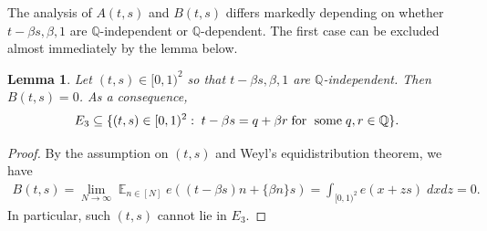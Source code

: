 \documentclass[11pt]{amsart}
\newtheorem{lemma}{Lemma}[section]
\theoremstyle{definition}
\DeclareMathOperator*{\E}{\mathbb{E}}
\newcommand{\Q}{{\mathbb Q}}
\newcommand{\1}{{\mathbf{1}}}
\begin{document}
The analysis of $A(t,s)$ and $B(t,s)$ differs markedly depending on whether $t-\beta s, \beta, 1$ are $\Q$-independent or $\Q$-dependent. The first case can be excluded almost immediately by the lemma below. 
\begin{lemma}\label{L: Q-independence}
    Let $(t,s)\in[0,1)^2$ so that $t-\beta s, \beta, 1$  are $\Q$-independent.
     Then $B(t,s) = 0$.  As a consequence, $$E_3\subseteq \{(t,s)\in[0,1)^2:\; t - \beta s = q + \beta r\; \textrm{for\; some}\; q,r\in\Q\}.$$   

\end{lemma}

\begin{proof}
By the assumption on $(t,s)$ and Weyl's equidistribution theorem, we have
\begin{align*}
    B(t,s) = \lim_{N\to\infty}\E_{n\in[N]} e((t - \beta s) n+\{\beta n\}s) =  \int_{[0,1)^2}e(x + zs)\; dxdz = 0.
\end{align*}
In particular, such $(t,s)$ cannot lie in $E_3$.
\end{proof}
\end{document}

